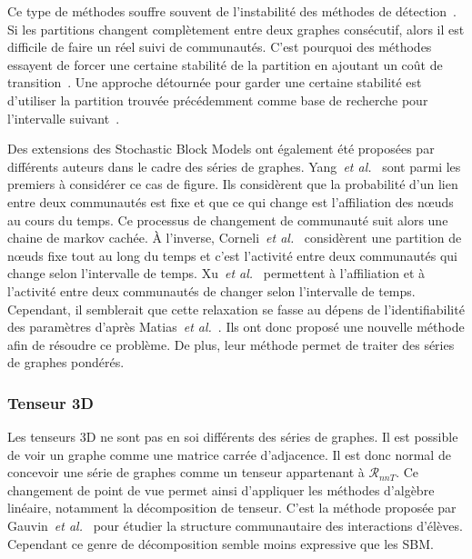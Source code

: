 Ce type de méthodes souffre souvent de l'instabilité des méthodes de détection~\cite{Aynaud2010,Harenberg2014a}.
Si les partitions changent complètement entre deux graphes consécutif, alors il est difficile de faire un réel suivi de communautés.
C'est pourquoi des méthodes essayent de forcer une certaine stabilité de la partition en ajoutant un coût de transition~\cite{Chakrabarti2006,Chen2013,Kalavathi2015}.
Une approche détournée pour garder une certaine stabilité est d'utiliser la partition trouvée précédemment comme base de recherche pour l'intervalle suivant~\cite{Lancichinetti2011a}.

Des extensions des Stochastic Block Models ont également été proposées par différents auteurs dans le cadre des séries de graphes.
Yang~\emph{et al.}~\cite{Yang2011} sont parmi les premiers à considérer ce cas de figure.
Ils considèrent que la probabilité d'un lien entre deux communautés est fixe et que ce qui change est l'affiliation des n\oe uds au cours du temps.
Ce processus de changement de communauté suit alors une chaine de markov cachée.
\`A l'inverse, Corneli~\emph{et al.}~\cite{Corneli2016} considèrent une partition de n\oe uds fixe tout au long du temps et c'est l'activité entre deux communautés qui change selon l'intervalle de temps.
Xu~\emph{et al.}~\cite{Xu2014} permettent à l'affiliation et à l'activité entre deux communautés de changer selon l'intervalle de temps.
Cependant, il semblerait que cette relaxation se fasse au dépens de l'identifiabilité des paramètres d'après Matias~\emph{et al.}~\cite{Matias2015}.
Ils ont donc proposé une nouvelle méthode afin de résoudre ce problème.
De plus, leur méthode permet de traiter des séries de graphes pondérés.

\subsubsection{Tenseur 3D}
Les tenseurs 3D ne sont pas en soi différents des séries de graphes.
Il est possible de voir un graphe comme une matrice carrée d'adjacence.
Il est donc normal de concevoir une série de graphes comme un tenseur appartenant à $\mathcal{R}_{nnT}$.
Ce changement de point de vue permet ainsi d'appliquer les méthodes d'algèbre linéaire, notamment la décomposition de tenseur.
C'est la méthode proposée par Gauvin~\emph{et al.}~\cite{Gauvin2014} pour étudier la structure communautaire des interactions d'élèves.
Cependant ce genre de décomposition semble moins expressive que les SBM.


